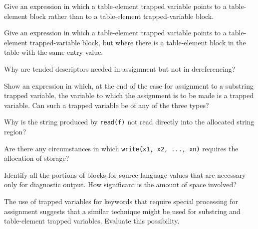  Give an expression in which a table-element
trapped variable points to a table-element block rather than to a
table-element trapped-variable block.

 Give an expression in which a table-element
trapped variable points to a table-element trapped-variable block, but
where there is a table-element block in the table with the same entry
value.

Why are tended descriptors needed in assignment but not in dereferencing?

 Show an expression in which, at the end of the case for
assignment to a substring trapped variable, the variable to which the
assignment is to be made is a trapped variable. Can such a trapped
variable be of any of the three types?

 Why is the string produced by \texttt{read(f)}
not read directly into the allocated string region?

 Are there any circumstances in which
\texttt{write(x1, x2, ..., xn)} requires the allocation of storage?

 Identify all the portions of blocks for
source-language values that are necessary only for diagnostic
output. How significant is the amount of space involved?

 The use of trapped variables for keywords that
require special processing for assignment suggests that a similar
technique might be used for substring and table-element trapped
variables. Evaluate this possibility.
